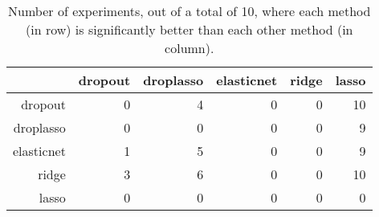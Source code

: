 \begin{table}[ht]
\centering
\begin{tabular}{rrrrrr}
  \hline
 & dropout & droplasso & elasticnet & ridge & lasso \\ 
  \hline
dropout &   0 &   4 &   0 &   0 &  10 \\ 
  droplasso &   0 &   0 &   0 &   0 &   9 \\ 
  elasticnet &   1 &   5 &   0 &   0 &   9 \\ 
  ridge &   3 &   6 &   0 &   0 &  10 \\ 
  lasso &   0 &   0 &   0 &   0 &   0 \\ 
   \hline
\end{tabular}
\caption{Number of experiments, out of a total of 10, where each method (in row) is significantly better than each other method (in column).} 
\end{table}
